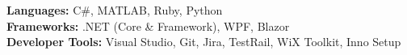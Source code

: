 \textbf{Languages:} C\#, MATLAB, Ruby, Python\\
\textbf{Frameworks:} .NET (Core \& Framework), WPF, Blazor \\
\textbf{Developer Tools:} Visual Studio, Git, Jira, TestRail, WiX Toolkit, Inno Setup 
